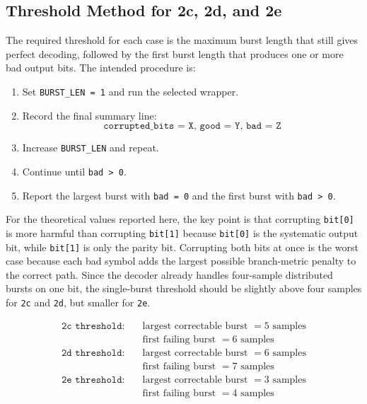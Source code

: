\documentclass{article}
\begin{document}
\subsection{Threshold Method for 2c, 2d, and 2e}

The required threshold for each case is the maximum burst length that still gives perfect decoding, followed by the first burst length that produces one or more bad output bits. The intended procedure is:

\begin{enumerate}
\item Set \texttt{BURST\_LEN = 1} and run the selected wrapper.
\item Record the final summary line:
\[
\texttt{corrupted\_bits = X,\ good = Y,\ bad = Z}
\]
\item Increase \texttt{BURST\_LEN} and repeat.
\item Continue until \texttt{bad > 0}.
\item Report the largest burst with \texttt{bad = 0} and the first burst with \texttt{bad > 0}.
\end{enumerate}

For the theoretical values reported here, the key point is that corrupting \texttt{bit[0]} is more harmful than corrupting \texttt{bit[1]} because \texttt{bit[0]} is the systematic output bit, while \texttt{bit[1]} is only the parity bit. Corrupting both bits at once is the worst case because each bad symbol adds the largest possible branch-metric penalty to the correct path. Since the decoder already handles four-sample distributed bursts on one bit, the single-burst threshold should be slightly above four samples for \texttt{2c} and \texttt{2d}, but smaller for \texttt{2e}.

\begin{align*}
\texttt{2c threshold:} & \quad \text{largest correctable burst } = 5 \text{ samples} \\
                       & \quad \text{first failing burst } = 6 \text{ samples} \\
\texttt{2d threshold:} & \quad \text{largest correctable burst } = 6 \text{ samples} \\
                       & \quad \text{first failing burst } = 7 \text{ samples} \\
\texttt{2e threshold:} & \quad \text{largest correctable burst } = 3 \text{ samples} \\
                       & \quad \text{first failing burst } = 4 \text{ samples}
\end{align*}
\end{document}

